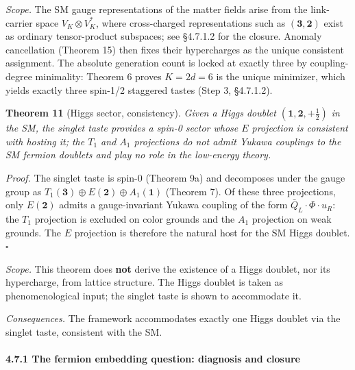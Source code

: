\documentclass[
]{article}
\begin{document}
\emph{Scope.} The SM gauge representations of the matter fields arise
from the link-carrier space \(V_K \otimes V_K^*\), where cross-charged
representations such as \((\mathbf{3}, \mathbf{2})\) exist as ordinary
tensor-product subspaces; see §4.7.1.2 for the closure. Anomaly
cancellation (Theorem 15) then fixes their hypercharges as the unique
consistent assignment. The absolute generation count is locked at
exactly three by coupling-degree minimality: Theorem 6 proves
\(K = 2d = 6\) is the unique minimizer, which yields exactly three
spin-1/2 staggered tastes (Step 3, §4.7.1.2).

\textbf{Theorem 11} (Higgs sector, consistency). \emph{Given a Higgs
doublet \((\mathbf{1}, \mathbf{2}, +\tfrac{1}{2})\) in the SM, the
singlet taste provides a spin-0 sector whose \(E\) projection is
consistent with hosting it; the \(T_1\) and \(A_1\) projections do not
admit Yukawa couplings to the SM fermion doublets and play no role in
the low-energy theory.}

\emph{Proof.} The singlet taste is spin-0 (Theorem 9a) and decomposes
under the gauge group as
\(T_1(\mathbf{3}) \oplus E(\mathbf{2}) \oplus A_1(\mathbf{1})\) (Theorem
7). Of these three projections, only \(E(\mathbf{2})\) admits a
gauge-invariant Yukawa coupling of the form
\(\bar Q_L \cdot \Phi \cdot u_R\): the \(T_1\) projection is excluded on
color grounds and the \(A_1\) projection on weak grounds. The \(E\)
projection is therefore the natural host for the SM Higgs doublet.
\(\square\)

\emph{Scope.} This theorem does \textbf{not} derive the existence of a
Higgs doublet, nor its hypercharge, from lattice structure. The Higgs
doublet is taken as phenomenological input; the singlet taste is shown
to accommodate it.

\emph{Consequences.} The framework accommodates exactly one Higgs
doublet via the singlet taste, consistent with the SM.

\hypertarget{the-fermion-embedding-question-diagnosis-and-closure}{%
\paragraph{4.7.1 The fermion embedding question: diagnosis and
closure}\label{the-fermion-embedding-question-diagnosis-and-closure}}
\end{document}
